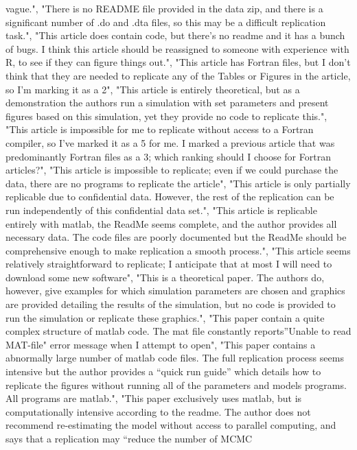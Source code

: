 \documentclass[]{article}
\begin{document}
\begin{itemize}
  vague.", "There is no README file provided in the data zip, and there
  is a significant number of .do and .dta files, so this may be a
  difficult replication task.", "This article does contain code, but
  there's no readme and it has a bunch of bugs. I think this article
  should be reassigned to someone with experience with R, to see if they
  can figure things out.", "This article has Fortran files, but I don't
  think that they are needed to replicate any of the Tables or Figures
  in the article, so I'm marking it as a 2", "This article is entirely
  theoretical, but as a demonstration the authors run a simulation with
  set parameters and present figures based on this simulation, yet they
  provide no code to replicate this.", "This article is impossible for
  me to replicate without access to a Fortran compiler, so I've marked
  it as a 5 for me. I marked a previous article that was predominantly
  Fortran files as a 3; which ranking should I choose for Fortran
  articles?", "This article is impossible to replicate; even if we could
  purchase the data, there are no programs to replicate the article",
  "This article is only partially replicable due to confidential data.
  However, the rest of the replication can be run independently of this
  confidential data set.", "This article is replicable entirely with
  matlab, the ReadMe seems complete, and the author provides all
  necessary data. The code files are poorly documented but the ReadMe
  should be comprehensive enough to make replication a smooth process.",
  "This article seems relatively straightforward to replicate; I
  anticipate that at most I will need to download some new software",
  "This is a theoretical paper. The authors do, however, give examples
  for which simulation parameters are chosen and graphics are provided
  detailing the results of the simulation, but no code is provided to
  run the simulation or replicate these graphics.", "This paper contain
  a quite complex structure of matlab code. The mat file constantly
  reports''Unable to read MAT-file" error message when I attempt to
  open", "This paper contains a abnormally large number of matlab code
  files. The full replication process seems intensive but the author
  provides a ``quick run guide'' which details how to replicate the
  figures without running all of the parameters and models programs. All
  programs are matlab.", "This paper exclusively uses matlab, but is
  computationally intensive according to the readme. The author does not
  recommend re-estimating the model without access to parallel
  computing, and says that a replication may ``reduce the number of MCMC

\end{itemize}
\end{document}
